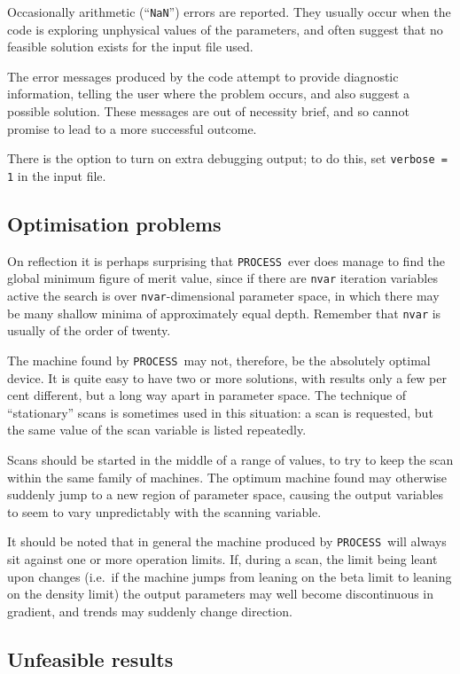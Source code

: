 \documentclass[11pt,a4paper]{report}
\newcommand{\process}{\mbox{\texttt{PROCESS}}}
\begin{document}
Occasionally arithmetic (``\texttt{NaN}'') errors are reported. They usually occur when the code is exploring unphysical values of the parameters, and often suggest that no feasible solution exists for the input file used.

The error messages produced by the code attempt to provide diagnostic
information, telling the user where the problem occurs, and also suggest a
possible solution. These messages are out of necessity brief, and so cannot
promise to lead to a more successful outcome.

There is the option to turn on extra debugging output; to do this, set \texttt{verbose = 1} in the input file.

\subsection{Optimisation problems}

On reflection it is perhaps surprising that \process\ ever does manage to
find the global minimum figure of merit value, since if there are
\texttt{nvar} iteration variables active the search is over
\texttt{nvar}-dimensional parameter space, in which there may be many shallow
minima of approximately equal depth. Remember that \texttt{nvar} is usually of
the order of twenty.

The machine found by \process\ may not, therefore, be the absolutely optimal
device. It is quite easy to have two or more solutions, with results only a
few per cent different, but a long way apart in parameter space. The technique
of ``stationary'' scans is sometimes used in this situation: a scan is requested, but the same value of the scan variable is listed repeatedly.

Scans should be started in the middle of a range of values, to try to keep the
scan within the same family of machines. The optimum machine found may
otherwise suddenly jump to a new region of parameter space, causing the output
variables to seem to vary unpredictably with the scanning variable.

It should be noted that in general the machine produced by \process\ will
always sit against one or more operation limits. If, during a scan, the limit
being leant upon changes (i.e.\ if the machine jumps from leaning on the beta
limit to leaning on the density limit) the output parameters may well become
discontinuous in gradient, and trends may suddenly change direction.

\subsection{Unfeasible results}
\end{document}

